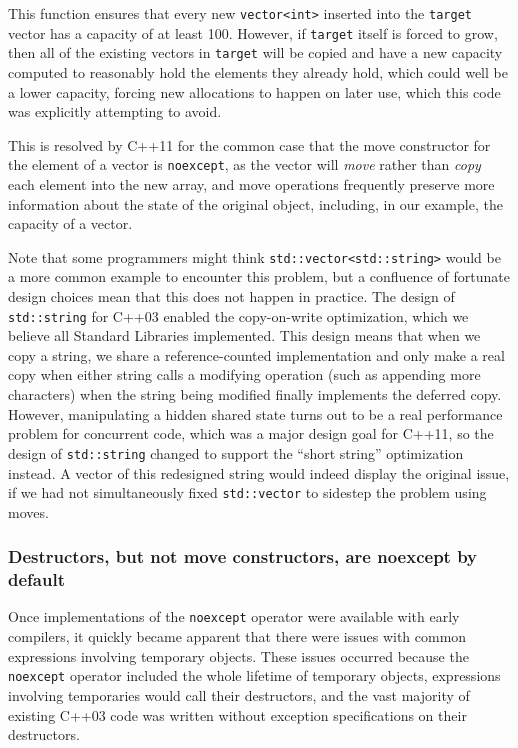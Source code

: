 \noindent This function ensures that every new \lstinline!vector<int>! inserted into
the \lstinline!target! vector has a capacity of at least 100. However, if
\lstinline!target! itself is forced to grow, then all of the existing
vectors in \lstinline!target! will be copied and have a new capacity
computed to reasonably hold the elements they already hold, which could
well be a lower capacity, forcing new allocations to happen on later
use, which this code was explicitly attempting to avoid.

This is resolved by C++11 for the common case that the move constructor
for the element of a vector is \lstinline!noexcept!, as the vector will
\emph{move} rather than \emph{copy} each element into the new array, and
move operations frequently preserve more information about the state of
the original object, including, in our example, the capacity of a
vector.

Note that some programmers might think \lstinline!std::vector<std::string>!
would be a more common example to encounter this problem, but a
confluence of fortunate design choices mean that this does not happen in
practice. The design of \lstinline!std::string! for C++03 enabled the
copy-on-write optimization, which we believe all Standard Libraries
implemented. This design means that when we copy a string, we share a
reference-counted implementation and only make a real copy when either
string calls a modifying operation (such as appending more characters)
when the string being modified finally implements the deferred copy.
However, manipulating a hidden shared state turns out to be a real
performance problem for concurrent code, which was a major design goal
for C++11, so the design of \lstinline!std::string! changed to support the
``short string'' optimization instead. A vector of this redesigned
string would indeed display the original issue, if we had not
simultaneously fixed \lstinline!std::vector! to sidestep the problem using
moves.

\subsubsection[Destructors, but not move constructors, are \lstinline!noexcept! by default]{Destructors, but not move constructors, are {\SubsubsecCode noexcept} by default}\label{destructors-but-not-move-constructors-are-noexcept-by-default}

Once implementations of the \lstinline!noexcept! operator were available
with early compilers, it quickly became apparent that there were issues
with common expressions involving temporary objects. These issues
occurred because the \lstinline!noexcept! operator included the whole
lifetime of temporary objects, expressions involving temporaries would
call their destructors, and the vast majority of existing C++03 code was
written without exception specifications on their destructors.

